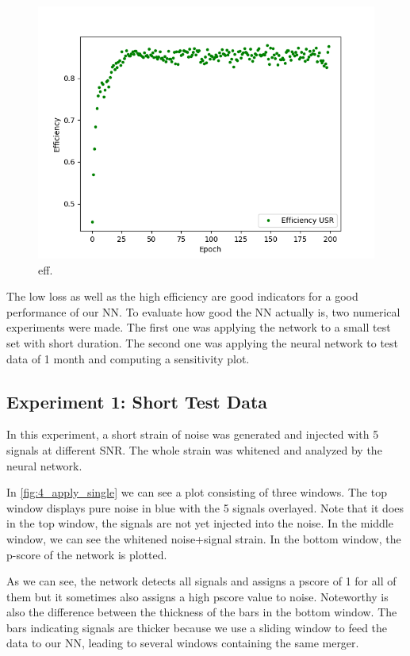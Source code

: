 \begin{figure}[ht]
  \includegraphics[width=\textwidth]{img/4_results/efficiencies.png}
  \caption{eff.}
  \label{fig:4_eff}
  \centering
\end{figure}

The low loss as well as the high efficiency are good indicators for a good
performance of our NN. To evaluate how good the NN actually is, two numerical
experiments were made. The first one was applying the network to a small test
set with short duration. The second one was applying the neural network to test
data of 1 month and computing a sensitivity plot.

\subsection{Experiment 1: Short Test Data}
In this experiment, a short strain of noise was generated and injected with 5
signals at different SNR. The whole strain was whitened and analyzed by the
neural network.

In \autoref{fig:4_apply_single} we can see a plot consisting of three windows.
The top window displays pure noise in blue with the 5 signals overlayed. Note
that it does in the top window, the signals are not yet injected into the noise.
In the middle window, we can see the whitened noise+signal strain. In the bottom
window, the p-score of the network is plotted.

As we can see, the network detects all signals and assigns a pscore of 1 for all
of them but it sometimes also assigns a high pscore value to noise. Noteworthy
is also the difference between the thickness of the bars in the bottom window.
The bars indicating signals are thicker because we use a sliding window to feed
the data to our NN, leading to several windows containing the same merger.

